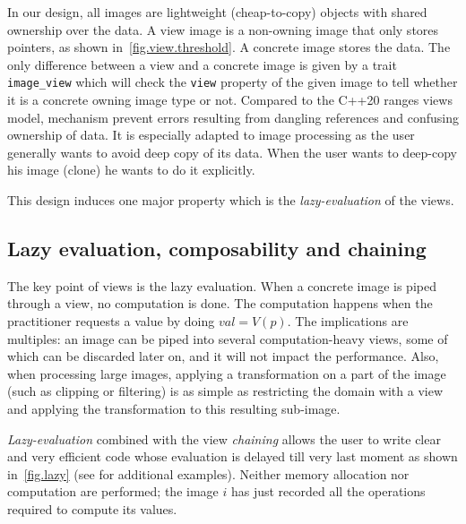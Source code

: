 In our design, all images are lightweight (cheap-to-copy) objects with shared ownership over the data. A view image is a
non-owning image that only stores pointers, as shown in~\cref{fig.view.threshold}. A concrete image stores the data. The
only difference between a view and a concrete image is given by a trait \texttt{image\_view} which will check the
\texttt{view} property of the given image to tell whether it is a concrete owning image type or not. Compared to the
C++20 ranges views model, mechanism prevent errors resulting from dangling references and confusing ownership of data.
It is especially adapted to image processing as the user generally wants to avoid deep copy of its data. When the user
wants to deep-copy his image (clone) he wants to do it explicitly.

This design induces one major property which is the \emph{lazy-evaluation} of the views.

\subsection{Lazy evaluation, composability and chaining}
\label{subsec:image.views.lazy.eval}

The key point of views is the lazy evaluation. When a concrete image is piped through a view, no computation is done.
The computation happens when the practitioner requests a value by doing $val = V(p)$. The implications are multiples: an
image can be piped into several computation-heavy views, some of which can be discarded later on, and it will not impact
the performance. Also, when processing large images, applying a transformation on a part of the image (such as clipping
or filtering) is as simple as restricting the domain with a view and applying the transformation to this resulting
sub-image.

\emph{Lazy-evaluation} combined with the view \emph{chaining} allows the user to write clear and very efficient code
whose evaluation is delayed till very last moment as shown in~\cref{fig.lazy} (see \parencite{geraud.2018.gtgdmm} for
additional examples). Neither memory allocation nor computation are performed; the image $i$ has just recorded all the
operations required to compute its values.

